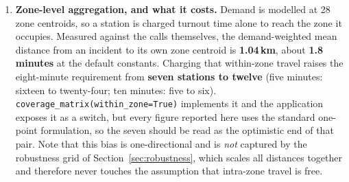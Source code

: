 \documentclass[conference]{IEEEtran}
\begin{document}
\begin{enumerate}
  \item \textbf{Zone-level aggregation, and what it costs.} Demand is
    modelled at 28 zone centroids, so a station is charged turnout time alone
    to reach the zone it occupies. Measured against the calls themselves, the
    demand-weighted mean distance from an incident to its own zone centroid is
    \textbf{1.04\,km}, about \textbf{1.8 minutes} at the default constants.
    Charging that within-zone travel
    raises the eight-minute requirement from \textbf{seven stations to twelve}
    (five minutes: sixteen to twenty-four; ten minutes: five to six).
    \texttt{coverage\_matrix(within\_zone=True)} implements it and the
    application exposes it as a switch, but every figure reported here uses the
    standard one-point formulation, so the seven should be read as the
    optimistic end of that pair. Note that this bias is one-directional and is
    \emph{not} captured by the robustness grid of
    Section~\ref{sec:robustness}, which scales all distances together and
    therefore never touches the assumption that intra-zone travel is free.


\end{enumerate}
\end{document}
